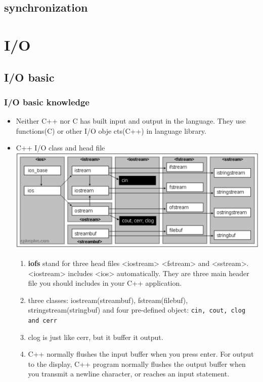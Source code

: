 \documentclass[a4paper,11pt,twoside]{book}
\begin{document}
\section{synchronization}


\chapter{I/O}
\section{I/O basic}
\subsection{I/O basic knowledge}
\begin{itemize}
	\item Neither C++ nor C has built input and output in the language. They use functions(C) or other I/O obje
	cts(C++) in language library.
	
	\item C++ I/O class and head file \\
	\includegraphics[scale=0.45]{pics/io.png}
	\begin{enumerate}
		
		\item \textbf{iofs} stand for three head files <iostream> <fstream> and <sstream>. <iostream> includes <ios> automatically. They are three main header file you should includes in your C++ application.
		
		\item three classes: iostream(streambuf), fstream(filebuf), stringstream(stringbuf) and four pre-defined object: \texttt{cin, cout, clog and cerr} 
		
		\item clog is just like cerr, but it buffer it output.
		
		\item C++ normally flushes the input buffer when you press enter. For output to the display, C++ program normally flushes the output buffer when you transmit a newline character, or reaches an input statement.
		

\end{enumerate}
\end{itemize}
\end{document}
